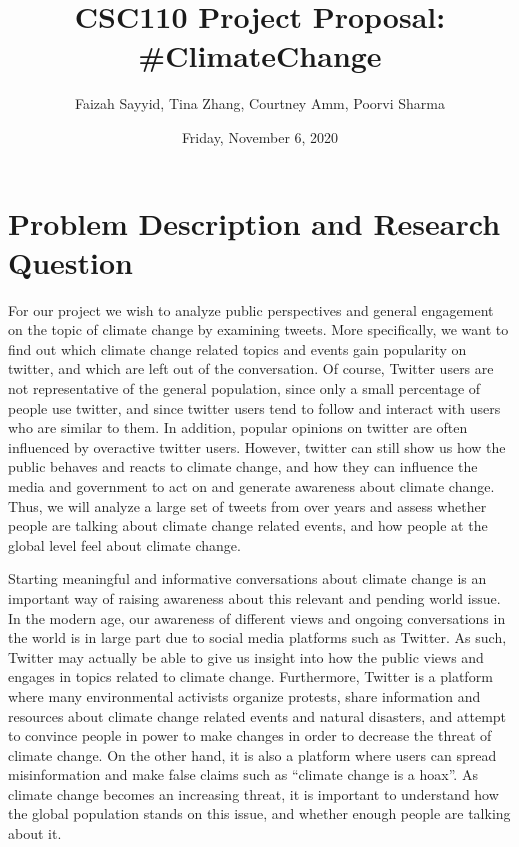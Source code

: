 \documentclass[fontsize=11pt]{article}
\title{CSC110 Project Proposal: \#ClimateChange}
\author{Faizah Sayyid, Tina Zhang, Courtney Amm, Poorvi Sharma}
\date{Friday, November 6, 2020}
\begin{document}
\maketitle


\section*{Problem Description and Research Question}

\qquad For our project we wish to analyze public perspectives and general engagement on the topic of climate change by examining tweets. More specifically, we want to find out which climate change related topics and events gain popularity on twitter, and which are left out of the conversation. Of course, Twitter users are not representative of the general population, since only a small percentage of people use twitter, and since twitter users tend to follow and interact with users who are similar to them. In addition, popular opinions on twitter are often influenced by overactive twitter users. However, twitter can still show us how the public behaves and reacts to climate change, and how they can influence the media and government to act on and generate awareness about climate change. Thus, we will analyze a large set of tweets from over years and assess whether people are talking about climate change related events, and how people at the global level feel about climate change. 

\vspace{0.5 cm}

Starting meaningful and informative conversations about climate change is an important way of raising awareness about this relevant and pending world issue. In the modern age, our awareness of different views and ongoing conversations in the world is in large part due to social media platforms such as Twitter. As such, Twitter may actually be able to give us insight into how the public views and engages in topics related to climate change. Furthermore, Twitter is a platform where many environmental activists organize protests, share information and resources about climate change related events and natural disasters, and attempt to convince people in power to make changes in order to decrease the threat of climate change. On the other hand, it is also a platform where users can spread misinformation and make false claims such as “climate change is a hoax”. As climate change becomes an increasing threat, it is important to understand how the global population stands on this issue, and whether enough people are talking about it.
\end{document}
